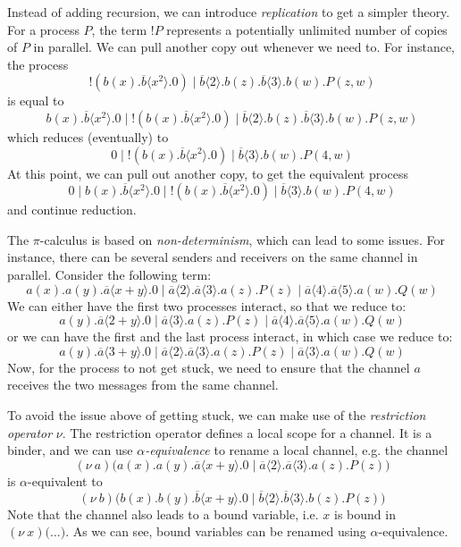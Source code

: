 \documentclass[a4paper, openany]{memoir}
\theoremstyle{definition}
\begin{document}
    Instead of adding recursion, we can introduce \emph{replication} to get a simpler theory. For a process $P$, the term $!P$ represents a potentially unlimited number of copies of $P$ in parallel. We can pull another copy out whenever we need to. For instance, the process
    \[!(b(x).\overline{b} \langle x^2 \rangle.0) \mid \overline{b} \langle 2 \rangle.b(z).\overline{b} \langle 3 \rangle.b(w).P(z, w)\]
    is equal to
    \[b(x).\overline{b} \langle x^2 \rangle.0 \mid !(b(x).\overline{b} \langle x^2 \rangle.0) \mid \overline{b} \langle 2 \rangle.b(z).\overline{b} \langle 3 \rangle.b(w).P(z, w)\]
    which reduces (eventually) to 
    \[0 \mid !(b(x).\overline{b} \langle x^2 \rangle.0) \mid \overline{b} \langle 3 \rangle.b(w).P(4, w)\]
    At this point, we can pull out another copy, to get the equivalent process
    \[0 \mid b(x).\overline{b} \langle x^2 \rangle.0 \mid !(b(x).\overline{b} \langle x^2 \rangle.0) \mid \overline{b} \langle 3 \rangle.b(w).P(4, w)\]
    and continue reduction.

    The $\pi$-calculus is based on \emph{non-determinism}, which can lead to some issues. For instance, there can be several senders and receivers on the same channel in parallel. Consider the following term:
    \[a(x).a(y).\overline{a}\langle x + y \rangle.0 \mid \overline{a} \langle 2 \rangle.\overline{a} \langle 3 \rangle.a(z).P(z) \mid \overline{a} \langle 4 \rangle.\overline{a} \langle 5 \rangle.a(w).Q(w)\]
    We can either have the first two processes interact, so that we reduce to:
    \[a(y).\overline{a}\langle 2 + y \rangle.0 \mid \overline{a} \langle 3 \rangle.a(z).P(z) \mid \overline{a} \langle 4 \rangle.\overline{a} \langle 5 \rangle.a(w).Q(w)\]
    or we can have the first and the last process interact, in which case we reduce to:
    \[a(y).\overline{a}\langle 3 + y \rangle.0 \mid \overline{a} \langle 2 \rangle.\overline{a} \langle 3 \rangle.a(z).P(z) \mid \overline{a} \langle 3 \rangle.a(w).Q(w)\]
    Now, for the process to not get stuck, we need to ensure that the channel $a$ receives the two messages from the same channel.

    To avoid the issue above of getting stuck, we can make use of the \emph{restriction operator} $\nu$. The restriction operator defines a local scope for a channel. It is a binder, and we can use \emph{$\alpha$-equivalence} to rename a local channel, e.g. the channel
    \[(\nu \ a)\textbf{(}a(x).a(y).\overline{a} \langle x + y \rangle.0 \mid \overline{a} \langle 2 \rangle.\overline{a} \langle 3 \rangle.a(z).P(z) \textbf{)}\]
    is $\alpha$-equivalent to
    \[(\nu \ b)\textbf{(}b(x).b(y).\overline{b} \langle x + y \rangle.0 \mid \overline{b} \langle 2 \rangle.\overline{b} \langle 3 \rangle.b(z).P(z) \textbf{)}\]
    Note that the channel also leads to a bound variable, i.e. $x$ is bound in $(\nu \ x)\textbf{(}\dots\textbf{)}$. As we can see, bound variables can be renamed using $\alpha$-equivalence.
\end{document}

